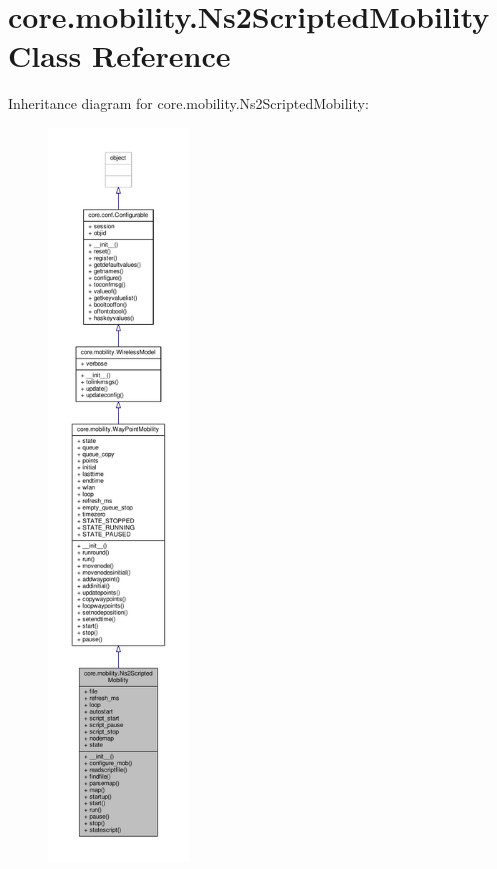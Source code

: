 \hypertarget{classcore_1_1mobility_1_1_ns2_scripted_mobility}{\section{core.\+mobility.\+Ns2\+Scripted\+Mobility Class Reference}
\label{classcore_1_1mobility_1_1_ns2_scripted_mobility}
}


Inheritance diagram for core.\+mobility.\+Ns2\+Scripted\+Mobility\+:
\nopagebreak
\begin{figure}[H]
\begin{center}
\leavevmode
\includegraphics[height=550pt]{classcore_1_1mobility_1_1_ns2_scripted_mobility__inherit__graph}
\end{center}
\end{figure}


